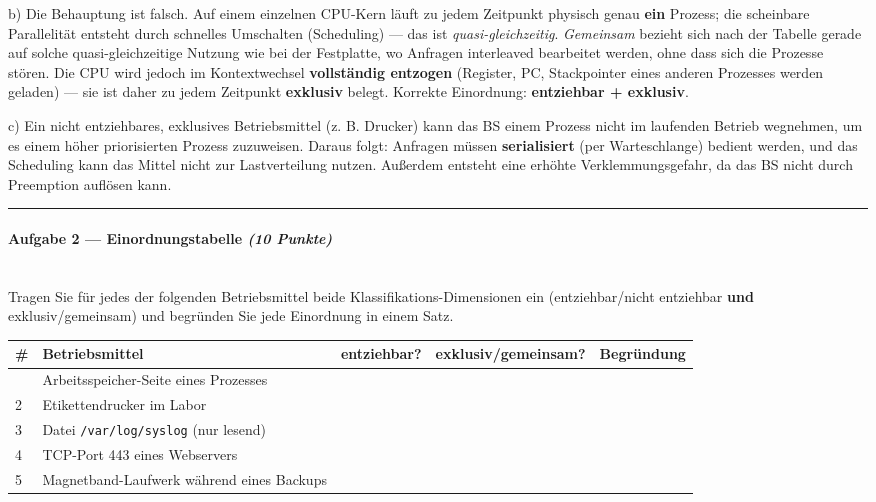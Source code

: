 \documentclass[11pt, a4paper]{article}
\begin{document}
b) Die Behauptung ist falsch. Auf einem einzelnen CPU-Kern läuft zu jedem Zeitpunkt physisch genau \textbf{ein} Prozess; die scheinbare Parallelität entsteht durch schnelles Umschalten (Scheduling) — das ist \textit{quasi-gleichzeitig}. \textit{Gemeinsam} bezieht sich nach der Tabelle gerade auf solche quasi-gleichzeitige Nutzung wie bei der Festplatte, wo Anfragen interleaved bearbeitet werden, ohne dass sich die Prozesse stören. Die CPU wird jedoch im Kontextwechsel \textbf{vollständig entzogen} (Register, PC, Stackpointer eines anderen Prozesses werden geladen) — sie ist daher zu jedem Zeitpunkt \textbf{exklusiv} belegt. Korrekte Einordnung: \textbf{entziehbar + exklusiv}.


c) Ein nicht entziehbares, exklusives Betriebsmittel (z. B. Drucker) kann das BS einem Prozess nicht im laufenden Betrieb wegnehmen, um es einem höher priorisierten Prozess zuzuweisen. Daraus folgt: Anfragen müssen \textbf{serialisiert} (per Warteschlange) bedient werden, und das Scheduling kann das Mittel nicht zur Lastverteilung nutzen. Außerdem entsteht eine erhöhte Verklemmungsgefahr, da das BS nicht durch Preemption auflösen kann.



\noindent\textcolor{rulegray}{\rule{\linewidth}{0.4pt}}


\paragraph{Aufgabe 2 — Einordnungstabelle \textit{(10 Punkte)}}\mbox{}\\[2pt]

Tragen Sie für jedes der folgenden Betriebsmittel beide Klassifikations-Dimensionen ein (entziehbar/nicht entziehbar \textbf{und} exklusiv/gemeinsam) und begründen Sie jede Einordnung in einem Satz.



{\small
\begin{tabularx}{\linewidth}{XXXXX}
\hline
\rowcolor{tableheadbg}
{\color{white}\textbf{\#}} & {\color{white}\textbf{Betriebsmittel}} & {\color{white}\textbf{entziehbar?}} & {\color{white}\textbf{exklusiv/gemeinsam?}} & {\color{white}\textbf{Begründung}} \\[2pt]
\hline
\endhead
\hline
\endfoot
1 & Arbeitsspeicher-Seite eines Prozesses &  &  &  \\
2 & Etikettendrucker im Labor &  &  &  \\
3 & Datei \texttt{/var/log/syslog} (nur lesend) &  &  &  \\
4 & TCP-Port 443 eines Webservers &  &  &  \\
5 & Magnetband-Laufwerk während eines Backups &  &  &  \\
\end{tabularx}
}
\end{document}
